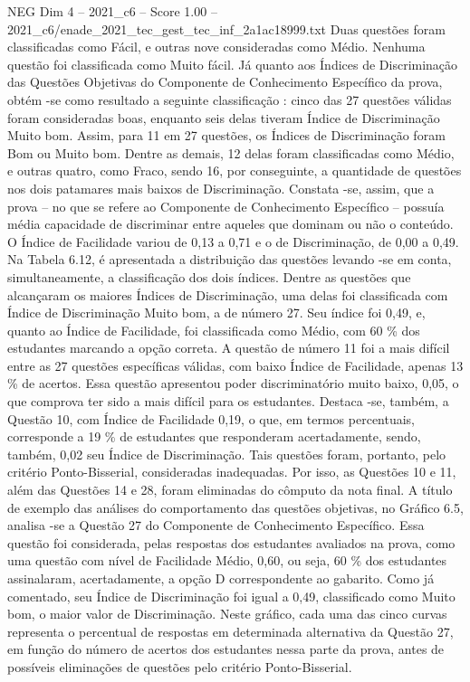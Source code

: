 \begin{textsample}{NEG Dim 4 – 2021\_c6 – Score 1.00 – 2021\_c6/enade\_2021\_tec\_gest\_tec\_inf\_2a1ac18999.txt}
Duas questões foram classificadas como Fácil, e outras nove consideradas como Médio.
Nenhuma questão foi classificada como Muito fácil.
Já quanto aos Índices de Discriminação das Questões Objetivas do Componente de Conhecimento Específico da prova, obtém -se como resultado a seguinte classificação : cinco das 27 questões válidas foram consideradas boas, enquanto seis delas tiveram Índice de Discriminação Muito bom.
Assim, para 11 em 27 questões, os Índices de Discriminação foram Bom ou Muito bom.
Dentre as demais, 12 delas foram classificadas como Médio, e outras quatro, como Fraco, sendo 16, por conseguinte, a quantidade de questões nos dois patamares mais baixos de Discriminação.
Constata -se, assim, que a prova – no que se refere ao Componente de Conhecimento Específico – possuía média capacidade de discriminar entre aqueles que dominam ou não o conteúdo.
O Índice de Facilidade variou de 0,13 a 0,71 e o de Discriminação, de 0,00 a 0,49.
Na Tabela 6.12, é apresentada a distribuição das questões levando -se em conta, simultaneamente, a classificação dos dois índices.
Dentre as questões que alcançaram os maiores Índices de Discriminação, uma delas foi classificada com Índice de Discriminação Muito bom, a de número 27.
Seu índice foi 0,49, e, quanto ao Índice de Facilidade, foi classificada como Médio, com 60 \% dos estudantes marcando a opção correta.
A questão de número 11 foi a mais difícil entre as 27 questões específicas válidas, com baixo Índice de Facilidade, apenas 13 \% de acertos.
Essa questão apresentou poder discriminatório muito baixo, 0,05, o que comprova ter sido a mais difícil para os estudantes.
Destaca -se, também, a Questão 10, com Índice de Facilidade 0,19, o que, em termos percentuais, corresponde a 19 \% de estudantes que responderam acertadamente, sendo, também, 0,02 seu Índice de Discriminação.
Tais questões foram, portanto, pelo critério Ponto-Bisserial, consideradas inadequadas.
Por isso, as Questões 10 e 11, além das Questões 14 e 28, foram eliminadas do cômputo da nota final.
A título de exemplo das análises do comportamento das questões objetivas, no Gráfico 6.5, analisa -se a Questão 27 do Componente de Conhecimento Específico.
Essa questão foi considerada, pelas respostas dos estudantes avaliados na prova, como uma questão com nível de Facilidade Médio, 0,60, ou seja, 60 \% dos estudantes assinalaram, acertadamente, a opção D correspondente ao gabarito.
Como já comentado, seu Índice de Discriminação foi igual a 0,49, classificado como Muito bom, o maior valor de Discriminação.
Neste gráfico, cada uma das cinco curvas representa o percentual de respostas em determinada alternativa da Questão 27, em função do número de acertos dos estudantes nessa parte da prova, antes de possíveis eliminações de questões pelo critério Ponto-Bisserial.

\end{textsample}
